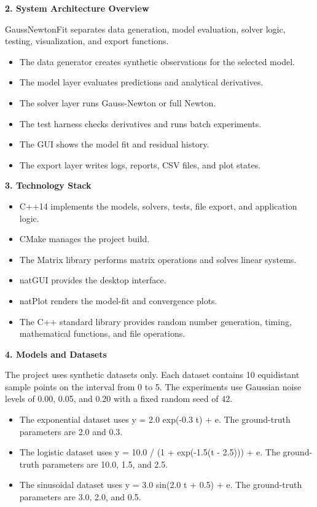 \documentclass[9pt,a4paper]{extarticle}
\newcommand{\Sec}[1]{\vspace{2pt}\noindent\textbf{#1}\par\vspace{2pt}}
\begin{document}
\Sec{2. System Architecture Overview}
GaussNewtonFit separates data generation, model evaluation, solver logic, testing, visualization, and export functions.
\begin{itemize}
\item The data generator creates synthetic observations for the selected model.
\item The model layer evaluates predictions and analytical derivatives.
\item The solver layer runs Gauss-Newton or full Newton.
\item The test harness checks derivatives and runs batch experiments.
\item The GUI shows the model fit and residual history.
\item The export layer writes logs, reports, CSV files, and plot states.
\end{itemize}

\Sec{3. Technology Stack}
\begin{itemize}
\item C++14 implements the models, solvers, tests, file export, and application logic.
\item CMake manages the project build.
\item The Matrix library performs matrix operations and solves linear systems.
\item natGUI provides the desktop interface.
\item natPlot renders the model-fit and convergence plots.
\item The C++ standard library provides random number generation, timing, mathematical functions, and file operations.
\end{itemize}

\Sec{4. Models and Datasets}
The project uses synthetic datasets only. Each dataset contains 10 equidistant sample points on the interval from 0 to 5. The experiments use Gaussian noise levels of 0.00, 0.05, and 0.20 with a fixed random seed of 42.
\begin{itemize}
\item The exponential dataset uses y = 2.0 exp(-0.3 t) + e. The ground-truth parameters are 2.0 and 0.3.
\item The logistic dataset uses y = 10.0 / (1 + exp(-1.5(t - 2.5))) + e. The ground-truth parameters are 10.0, 1.5, and 2.5.
\item The sinusoidal dataset uses y = 3.0 sin(2.0 t + 0.5) + e. The ground-truth parameters are 3.0, 2.0, and 0.5.
\end{itemize}
\newpage
\end{document}
